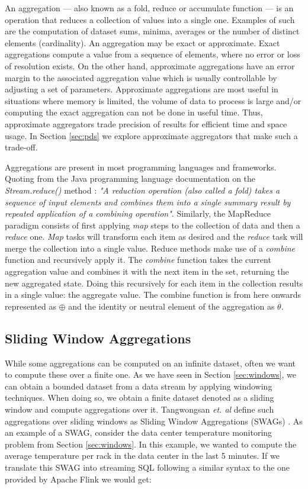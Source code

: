 An aggregation --- also known as a fold, reduce or accumulate function --- is an operation that reduces a collection of values into a single one. Examples of such are the computation of dataset sums, minima, averages or the number of distinct elements (cardinality). An aggregation may be exact or approximate. Exact aggregations compute a value from a sequence of elements, where no error or loss of resolution exists. On the other hand, approximate aggregations have an error margin to the associated aggregation value which is usually controllable by adjusting a set of parameters. 
Approximate aggregations are most useful in situations where memory is limited, the volume of data to process is large and/or computing the exact aggregation can not be done in useful time. Thus, approximate aggregators trade precision of results for efficient time and space usage. In Section \ref{sec:pds} we explore approximate aggregators that make such a trade-off.

Aggregations are present in most programming languages and frameworks. Quoting from the Java programming language documentation on the \textit{Stream.reduce()} method \cite{Java13StreamReduce}: 
\textit{"A reduction operation (also called a fold) takes a sequence of input elements and combines them into a single summary result by repeated application of a combining operation"}. Similarly, the MapReduce \cite{MapReduce} paradigm consists of first applying \textit{map} steps to the collection of data and then a \textit{reduce} one. \textit{Map} tasks will transform each item as desired and the \textit{reduce} task will merge the collection into a single value. Reduce methods make use of a \textit{combine} function and recursively apply it. The \textit{combine} function takes the current aggregation value and combines it with the next item in the set, returning the new aggregated state. Doing this recursively for each item in the collection results in a single value: the aggregate value. The combine function is from here onwards represented as $\oplus$ and the identity or neutral element of the aggregation as $\overline{\theta}$.

\subsection{Sliding Window Aggregations}

While some aggregations can be computed on an infinite dataset, often we want to compute these over a finite one. As we have seen in Section \ref{sec:windows}, we can obtain a bounded dataset from a data stream by applying windowing techniques. When doing so, we obtain a finite dataset denoted as a sliding window and compute aggregations over it. Tangwongsan \emph{et. al} define such aggregations over sliding windows as Sliding Window Aggregations (SWAGs) \cite{Tangwongsan-Sliding-Window-Aggregation-Algorithms}. As an example of a SWAG, consider the data center temperature monitoring problem from Section \ref{sec:windows}. In this example, we wanted to compute the average temperature per rack in the data center in the last 5 minutes. If we translate this SWAG into streaming SQL following a similar syntax to the one provided by Apache Flink \cite{ApacheFlink} we would get:

